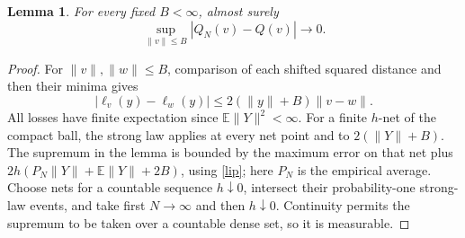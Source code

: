 \documentclass[11pt]{article}
\newtheorem{lemma}[theorem]{Lemma}
\newcommand{\E}{\mathbb E}
\begin{document}
\begin{lemma}\label{ulln}
For every fixed $B<\infty$, almost surely
\[
 \sup_{\|v\|\leq B}|Q_N(v)-Q(v)|\longrightarrow0.
\]
\end{lemma}
\begin{proof}
For $\|v\|,\|w\|\leq B$, comparison of each shifted squared
distance and then their minima gives
\begin{equation}\label{lip}
 |\ell_v(y)-\ell_w(y)|
          \leq2(\|y\|+B)\|v-w\|.
\end{equation}
All losses have finite expectation since $\E\|Y\|^2<\infty$.
For a finite $h$-net of the compact ball, the strong law applies at
every net point and to $2(\|Y\|+B)$. The supremum in the lemma is
bounded by the maximum error on that net plus
$2h(P_N\|Y\|+\E\|Y\|+2B)$, using \eqref{lip}; here $P_N$ is
the empirical average. Choose nets for a countable sequence
$h\downarrow0$, intersect their probability-one strong-law events,
and take first $N\to\infty$ and then $h\downarrow0$.
Continuity permits the supremum to be taken over a countable dense
set, so it is measurable.
\end{proof}
\end{document}
